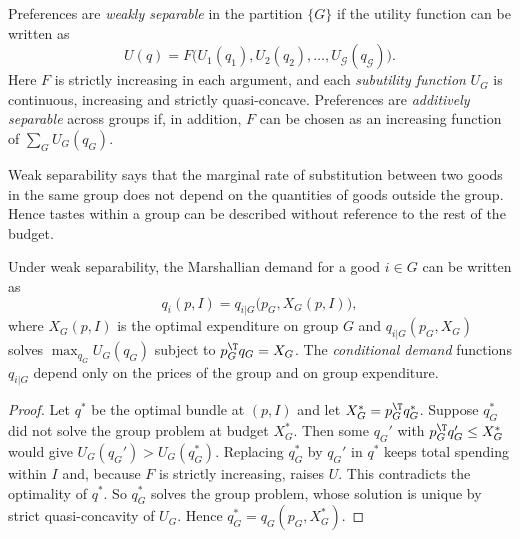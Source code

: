 \begin{definition}\label{def:05-weak-sep}
Preferences are \emph{weakly separable} in the partition $\{G\}$ if the utility function can be written as
\begin{equation}\label{eq:05-weak-sep}
  U(q) = F\bigl(U_1(q_1), U_2(q_2), \dots, U_{\mathcal{G}}(q_{\mathcal{G}})\bigr).
\end{equation}
Here $F$ is strictly increasing in each argument, and each \emph{subutility function} $U_G$ is
continuous, increasing and strictly quasi-concave. Preferences are \emph{additively separable} across groups if, in
addition, $F$ can be chosen as an increasing function of $\sum_G U_G(q_G)$.
\end{definition}

Weak separability says that the marginal rate of substitution between two goods in the same group does
not depend on the quantities of goods outside the group. Hence tastes within a group can be described
without reference to the rest of the budget.

\begin{proposition}\label{prop:05-second-stage}
Under weak separability, the Marshallian demand for a good $i \in G$ can be written as
\begin{equation}\label{eq:05-conditional-demand}
  q_i(p, I) = q_{i|G}\bigl(p_G, X_G(p, I)\bigr),
\end{equation}
where $X_G(p, I)$ is the optimal expenditure on group $G$ and $q_{i|G}(p_G, X_G)$ solves
$\max_{q_G} U_G(q_G)$ subject to $p_G^{\T} q_G = X_G$. The \emph{conditional demand} functions
$q_{i|G}$ depend only on the prices of the group and on group expenditure.
\end{proposition}

\begin{proof}
Let $q^*$ be the optimal bundle at $(p, I)$ and let $X_G^* = p_G^{\T} q_G^*$. Suppose $q_G^*$ did not
solve the group problem at budget $X_G^*$. Then some $q_G'$ with $p_G^{\T} q_G' \le X_G^*$ would give
$U_G(q_G') > U_G(q_G^*)$. Replacing $q_G^*$ by $q_G'$ in $q^*$ keeps total spending within $I$ and, because
$F$ is strictly increasing, raises $U$. This contradicts the optimality of $q^*$. So $q_G^*$ solves the
group problem, whose solution is unique by strict quasi-concavity of $U_G$. Hence $q_G^* =
q_G(p_G, X_G^*)$.
\end{proof}


